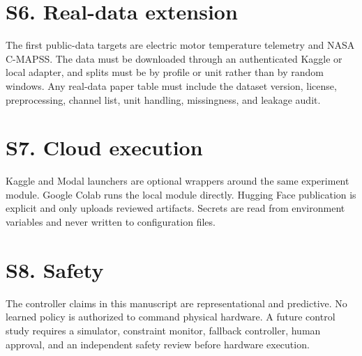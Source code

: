 \documentclass[11pt]{article}
\begin{document}
\section*{S6. Real-data extension}
The first public-data targets are electric motor temperature telemetry and NASA C-MAPSS. The data must be downloaded through an authenticated Kaggle or local adapter, and splits must be by profile or unit rather than by random windows. Any real-data paper table must include the dataset version, license, preprocessing, channel list, unit handling, missingness, and leakage audit.
\section*{S7. Cloud execution}
Kaggle and Modal launchers are optional wrappers around the same experiment module. Google Colab runs the local module directly. Hugging Face publication is explicit and only uploads reviewed artifacts. Secrets are read from environment variables and never written to configuration files.
\section*{S8. Safety}
The controller claims in this manuscript are representational and predictive. No learned policy is authorized to command physical hardware. A future control study requires a simulator, constraint monitor, fallback controller, human approval, and an independent safety review before hardware execution.
\end{document}
